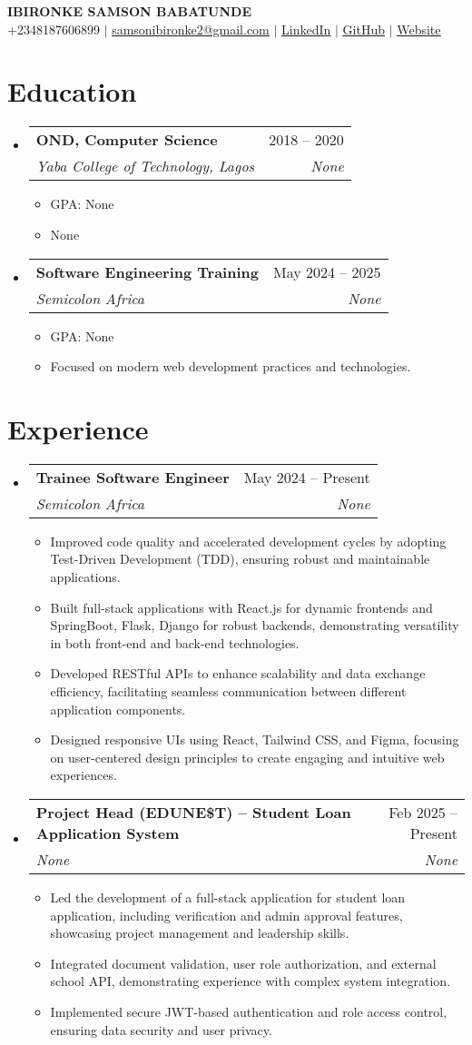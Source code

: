 \documentclass[letterpaper,11pt]{article}
\makeatletter
\newcommand{\resumeItem}[1]{
  \item\small{
    {#1 \vspace{-2pt}}
  }
}
\newcommand{\resumeSubheading}[4]{
  \vspace{-2pt}\item
    \begin{tabular*}{0.97\textwidth}[t]{l@{\extracolsep{\fill}}r}
      \textbf{#1} & #2 \\
      \textit{\small#3} & \textit{\small #4} \\
    \end{tabular*}\vspace{-7pt}
}
\newcommand{\resumeSubHeadingListStart}{\begin{itemize}[leftmargin=0.15in, label={}]}
\newcommand{\resumeSubHeadingListEnd}{\end{itemize}}
\newcommand{\resumeItemListStart}{\begin{itemize}}
\newcommand{\resumeItemListEnd}{\end{itemize}\vspace{-5pt}}
\makeatother
\begin{document}
\begin{center}
    \textbf{\Huge \scshape IBIRONKE SAMSON BABATUNDE} \\ \vspace{1pt}
    \small +2348187606899 $|$ \href{mailto:samsonibironke2@gmail.com}{\underline{samsonibironke2@gmail.com}} $|$ \href{https://None}{\underline{LinkedIn}} $|$ \href{https://None}{\underline{GitHub}} $|$ \href{https://None}{\underline{Website}}
\end{center}

\section{Education}
  \resumeSubHeadingListStart
    \resumeSubheading
      {OND, Computer Science}{2018 -- 2020}
      {Yaba College of Technology, Lagos}{None}
      \resumeItemListStart
        \resumeItem{GPA: None}
        \resumeItem{None}
      \resumeItemListEnd
    \resumeSubheading
      {Software Engineering Training}{May 2024 -- 2025}
      {Semicolon Africa}{None}
      \resumeItemListStart
        \resumeItem{GPA: None}
        \resumeItem{Focused on modern web development practices and technologies.}
      \resumeItemListEnd
  \resumeSubHeadingListEnd

\section{Experience}
  \resumeSubHeadingListStart
    \resumeSubheading
      {Trainee Software Engineer}{May 2024 -- Present}
      {Semicolon Africa}{None}
      \resumeItemListStart
        \resumeItem{Improved code quality and accelerated development cycles by adopting Test-Driven Development (TDD), ensuring robust and maintainable applications.}
        \resumeItem{Built full-stack applications with React.js for dynamic frontends and SpringBoot, Flask, Django for robust backends, demonstrating versatility in both front-end and back-end technologies.}
        \resumeItem{Developed RESTful APIs to enhance scalability and data exchange efficiency, facilitating seamless communication between different application components.}
        \resumeItem{Designed responsive UIs using React, Tailwind CSS, and Figma, focusing on user-centered design principles to create engaging and intuitive web experiences.}
      \resumeItemListEnd
    \resumeSubheading
      {Project Head (EDUNE\$T) -- Student Loan Application System}{Feb 2025 -- Present}
      {None}{None}
      \resumeItemListStart
        \resumeItem{Led the development of a full-stack application for student loan application, including verification and admin approval features, showcasing project management and leadership skills.}
        \resumeItem{Integrated document validation, user role authorization, and external school API, demonstrating experience with complex system integration.}
        \resumeItem{Implemented secure JWT-based authentication and role access control, ensuring data security and user privacy.}
      \resumeItemListEnd
  \resumeSubHeadingListEnd
\end{document}
